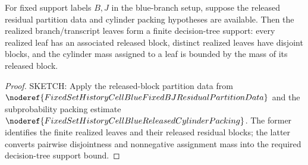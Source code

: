 \begin{helper}
For fixed support labels \(B,J\) in the blue-branch setup, suppose the
released residual partition data and cylinder packing hypotheses are
available.  Then the realized branch/transcript leaves form a finite
decision-tree support: every realized leaf has an associated released block,
distinct realized leaves have disjoint blocks, and the cylinder mass assigned
to a leaf is bounded by the mass of its released block.
\end{helper}
\begin{proof}
SKETCH:
Apply the released-block partition data from
\(\noderef{FixedSetHistoryCellBlueFixedBJResidualPartitionData}\) and the
subprobability packing estimate
\(\noderef{FixedSetHistoryCellBlueReleasedCylinderPacking}\).  The former
identifies the finite realized leaves and their released residual blocks; the
latter converts pairwise disjointness and nonnegative assignment mass into
the required decision-tree support bound.
\end{proof}

